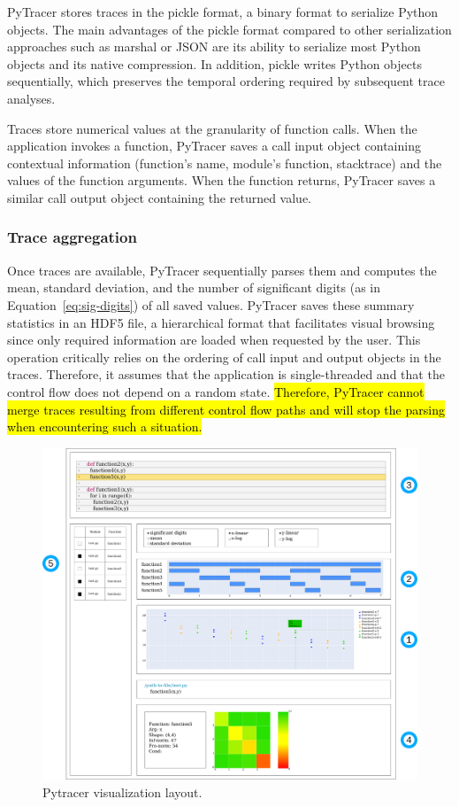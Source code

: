\documentclass[10pt,journal,compsoc]{IEEEtran}
\newcommand{\pytracer}[0]{PyTracer\xspace}
\DeclareRobustCommand{\add}[1]{\sethlcolor{lightgreen}\hl{#1}}
\begin{document}
\pytracer stores traces in the pickle format, a binary format to serialize
Python objects. The main advantages of the pickle format compared to other
serialization approaches such as marshal or JSON are its ability to serialize
most Python objects and its native compression.  In addition, pickle writes
Python objects sequentially, which preserves the temporal ordering required by
subsequent trace analyses.

Traces store numerical values at the granularity of function calls. When the
application invokes a function, \pytracer saves a call input object containing
contextual information (function's name, module's function, stacktrace) and the
values of the function arguments. When the function returns, \pytracer saves a
similar call output object containing the returned value. 


\subsubsection{Trace aggregation}

Once traces are available, \pytracer sequentially parses them and computes the
mean, standard deviation, and the number of significant digits (as in
Equation~\ref{eq:sig-digits}) of all saved values. \pytracer saves these summary
statistics in an HDF5 file, a hierarchical format that facilitates visual
browsing since only required information are loaded when requested by the user.
This operation critically relies on the ordering of call input and output
objects in the traces. Therefore, it assumes that the application is
single-threaded and that the control flow does not depend on a random state.
\add{Therefore, \mbox{\pytracer} cannot merge traces resulting from different
    control flow paths and will stop the parsing when encountering such a situation.}

\begin{figure}
    \centering
    \includegraphics[width=0.75\linewidth]{figure/pytracer_layout.pdf}
    \caption{Pytracer visualization layout.}
    \label{fig:visu-layout}
\end{figure}
\end{document}
